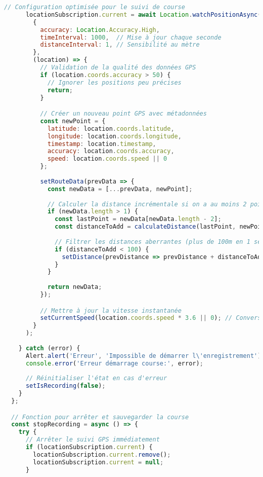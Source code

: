 \begin{lstlisting}[language=javascript, caption=Composant d'enregistrement de course]
      // Configuration optimisée pour le suivi de course
      locationSubscription.current = await Location.watchPositionAsync(
        {
          accuracy: Location.Accuracy.High,
          timeInterval: 1000,  // Mise à jour chaque seconde
          distanceInterval: 1, // Sensibilité au mètre
        },
        (location) => {
          // Validation de la qualité des données GPS
          if (location.coords.accuracy > 50) {
            // Ignorer les positions peu précises
            return;
          }

          // Créer un nouveau point GPS avec métadonnées
          const newPoint = {
            latitude: location.coords.latitude,
            longitude: location.coords.longitude,
            timestamp: location.timestamp,
            accuracy: location.coords.accuracy,
            speed: location.coords.speed || 0
          };
          
          setRouteData(prevData => {
            const newData = [...prevData, newPoint];
            
            // Calculer la distance incrémentale si on a au moins 2 points
            if (newData.length > 1) {
              const lastPoint = newData[newData.length - 2];
              const distanceToAdd = calculateDistance(lastPoint, newPoint);
              
              // Filtrer les distances aberrantes (plus de 100m en 1 seconde)
              if (distanceToAdd < 100) {
                setDistance(prevDistance => prevDistance + distanceToAdd);
              }
            }
            
            return newData;
          });

          // Mettre à jour la vitesse instantanée
          setCurrentSpeed(location.coords.speed * 3.6 || 0); // Conversion m/s vers km/h
        }
      );
      
    } catch (error) {
      Alert.alert('Erreur', 'Impossible de démarrer l\'enregistrement');
      console.error('Erreur démarrage course:', error);
      
      // Réinitialiser l'état en cas d'erreur
      setIsRecording(false);
    }
  };

  // Fonction pour arrêter et sauvegarder la course
  const stopRecording = async () => {
    try {
      // Arrêter le suivi GPS immédiatement
      if (locationSubscription.current) {
        locationSubscription.current.remove();
        locationSubscription.current = null;
      }


\end{lstlisting}
